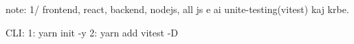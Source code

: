 note: 
1/ frontend, react, backend, nodejs, all js e ai unite-testing(vitest) kaj krbe.

CLI:
1: yarn init -y
2: yarn add vitest -D